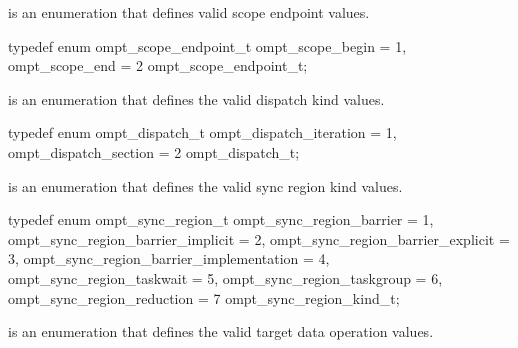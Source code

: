 
\label{sec:ompt_scope_endpoint_t}
 is an enumeration that defines valid scope endpoint values.


\begin{ccppspecific}
\begin{omptEnum}
typedef enum ompt_scope_endpoint_t {
  ompt_scope_begin                    = 1,
  ompt_scope_end                      = 2
} ompt_scope_endpoint_t;
\end{omptEnum}
\end{ccppspecific}




\label{sec:ompt_dispatch_t}
 is an enumeration that defines the valid dispatch kind values.


\begin{ccppspecific}
\begin{omptEnum}
typedef enum ompt_dispatch_t {
  ompt_dispatch_iteration             = 1,
  ompt_dispatch_section               = 2
} ompt_dispatch_t;
\end{omptEnum}
\end{ccppspecific}




\label{sec:ompt_sync_region_t}
 is an enumeration that defines the valid sync region kind values.


\begin{ccppspecific}
\begin{omptEnum}
typedef enum ompt_sync_region_t {
  ompt_sync_region_barrier                = 1,
  ompt_sync_region_barrier_implicit       = 2,
  ompt_sync_region_barrier_explicit       = 3,
  ompt_sync_region_barrier_implementation = 4,
  ompt_sync_region_taskwait               = 5,
  ompt_sync_region_taskgroup              = 6,
  ompt_sync_region_reduction              = 7
} ompt_sync_region_kind_t;
\end{omptEnum}
\end{ccppspecific}





\label{sec:ompt_target_data_op_t}
 is an enumeration that defines the valid target data operation values.


